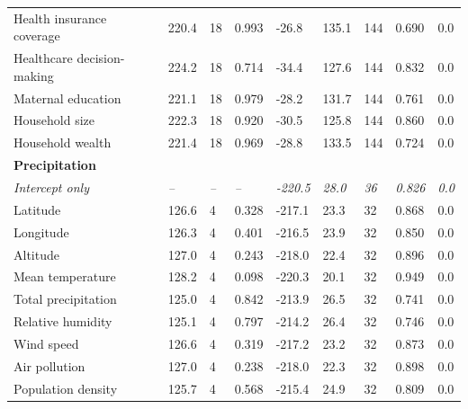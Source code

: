 \begin{longtable}[t]{lllllllll}
\hspace{1em}Health insurance coverage & 220.4 & 18 & 0.993 & -26.8 & 135.1 & 144 & 0.690 & 0.0\\
\hspace{1em}Healthcare decision-making & 224.2 & 18 & 0.714 & -34.4 & 127.6 & 144 & 0.832 & 0.0\\
\hspace{1em}Maternal education & 221.1 & 18 & 0.979 & -28.2 & 131.7 & 144 & 0.761 & 0.0\\
\hspace{1em}Household size & 222.3 & 18 & 0.920 & -30.5 & 125.8 & 144 & 0.860 & 0.0\\
\hspace{1em}Household wealth & 221.4 & 18 & 0.969 & -28.8 & 133.5 & 144 & 0.724 & 0.0\\
\midrule
\textbf{Precipitation} & \textbf{} & \textbf{} & \textbf{} & \textbf{} & \textbf{} & \textbf{} & \textbf{} & \textbf{}\\
\em{\hspace{1em}Intercept only} & \em{–} & \em{–} & \em{–} & \em{-220.5} & \em{28.0} & \em{36} & \em{0.826} & \em{0.0}\\
\hspace{1em}Latitude & 126.6 & 4 & 0.328 & -217.1 & 23.3 & 32 & 0.868 & 0.0\\
\hspace{1em}Longitude & 126.3 & 4 & 0.401 & -216.5 & 23.9 & 32 & 0.850 & 0.0\\
\hspace{1em}Altitude & 127.0 & 4 & 0.243 & -218.0 & 22.4 & 32 & 0.896 & 0.0\\
\hspace{1em}Mean temperature & 128.2 & 4 & 0.098 & -220.3 & 20.1 & 32 & 0.949 & 0.0\\
\hspace{1em}Total precipitation & 125.0 & 4 & 0.842 & -213.9 & 26.5 & 32 & 0.741 & 0.0\\
\hspace{1em}Relative humidity & 125.1 & 4 & 0.797 & -214.2 & 26.4 & 32 & 0.746 & 0.0\\
\hspace{1em}Wind speed & 126.6 & 4 & 0.319 & -217.2 & 23.2 & 32 & 0.873 & 0.0\\
\hspace{1em}Air pollution & 127.0 & 4 & 0.238 & -218.0 & 22.3 & 32 & 0.898 & 0.0\\
\hspace{1em}Population density & 125.7 & 4 & 0.568 & -215.4 & 24.9 & 32 & 0.809 & 0.0\\

\end{longtable}
